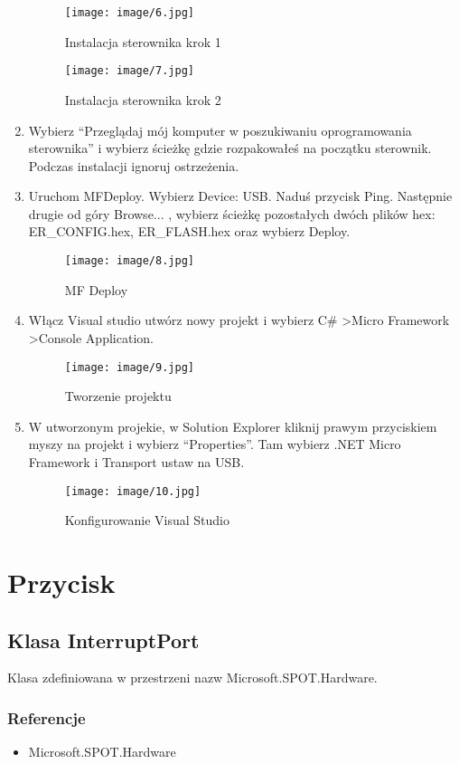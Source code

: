 \documentclass{article}
\begin{document}
\begin{enumerate}
\begin{figure}[H]
\texttt{[image: image/6.jpg]}
\caption{Instalacja sterownika krok 1}
\end{figure}
\begin{figure}[H]
\texttt{[image: image/7.jpg]}
\caption{Instalacja sterownika krok 2}
\end{figure}

\item Wybierz “Przeglądaj mój komputer w poszukiwaniu oprogramowania sterownika” i wybierz ścieżkę gdzie rozpakowałeś na początku sterownik. Podczas instalacji ignoruj ostrzeżenia.
\item Uruchom MFDeploy. Wybierz Device: USB. Naduś przycisk Ping. Następnie drugie od góry Browse... , wybierz ścieżkę pozostałych dwóch plików hex: ER\_CONFIG.hex, ER\_FLASH.hex oraz wybierz Deploy.

\begin{figure}[H]
\texttt{[image: image/8.jpg]}
\caption{MF Deploy}
\end{figure}
\item Włącz Visual studio utwórz nowy projekt i wybierz C\# \textgreater Micro Framework \textgreater Console Application.

\begin{figure}[H]
\texttt{[image: image/9.jpg]}
\caption{Tworzenie projektu}
\end{figure}
\item W utworzonym projekie, w Solution Explorer kliknij prawym przyciskiem myszy na projekt i wybierz “Properties”. Tam wybierz .NET Micro Framework i Transport ustaw na USB.

\begin{figure}[H]
\texttt{[image: image/10.jpg]}
\caption{Konfigurowanie Visual Studio}
\end{figure}
\end{enumerate}

\section{Przycisk}
\subsection{Klasa InterruptPort}
Klasa zdefiniowana w przestrzeni nazw Microsoft.SPOT.Hardware.
\subsubsection{Referencje}
\begin{itemize}
\item Microsoft.SPOT.Hardware
\end{itemize}
\end{document}
